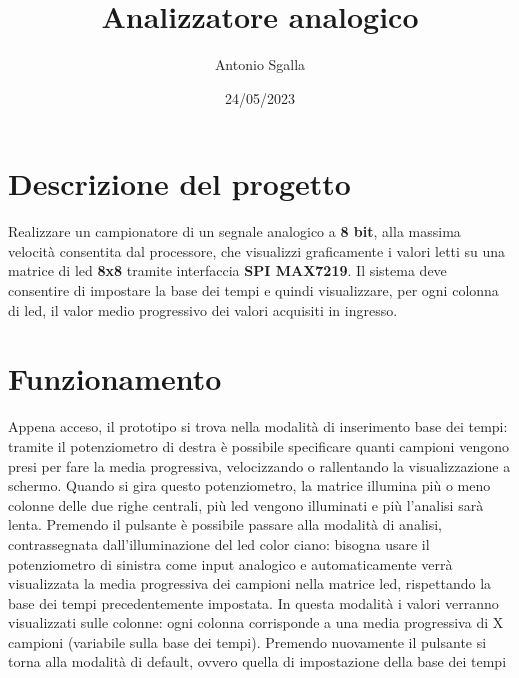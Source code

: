 \documentclass{article}
\title{Analizzatore analogico}
\author{Antonio Sgalla}
\date{24/05/2023}
\begin{document}
\maketitle

\section{Descrizione del progetto}
Realizzare un campionatore di un segnale analogico a \textbf{8 bit}, alla massima velocità consentita dal processore, che visualizzi graficamente i valori letti su una matrice di led \textbf{8x8} tramite interfaccia \textbf{SPI MAX7219}.
\newline\newline
Il sistema deve consentire di impostare la base dei tempi e quindi visualizzare, per ogni colonna di led, il valor medio progressivo dei valori acquisiti in ingresso.

\section{Funzionamento}
Appena acceso, il prototipo si trova nella modalità di inserimento base dei tempi: tramite il potenziometro di destra è possibile specificare quanti campioni vengono presi per fare la media progressiva, velocizzando o rallentando la visualizzazione a schermo.
Quando si gira questo potenziometro, la matrice illumina più o meno colonne delle due righe centrali, più led vengono illuminati e più l'analisi sarà lenta.
\newline\newline
Premendo il pulsante è possibile passare alla modalità di analisi, contrassegnata dall'illuminazione del led color ciano: bisogna usare il potenziometro di sinistra come input analogico e automaticamente verrà visualizzata la media progressiva dei campioni nella matrice led, rispettando la base dei tempi precedentemente impostata.
In questa modalità i valori verranno visualizzati sulle colonne: ogni colonna corrisponde a una media progressiva di X campioni (variabile sulla base dei tempi).
\newline\newline
Premendo nuovamente il pulsante si torna alla modalità di default, ovvero quella di impostazione della base dei tempi
\end{document}
